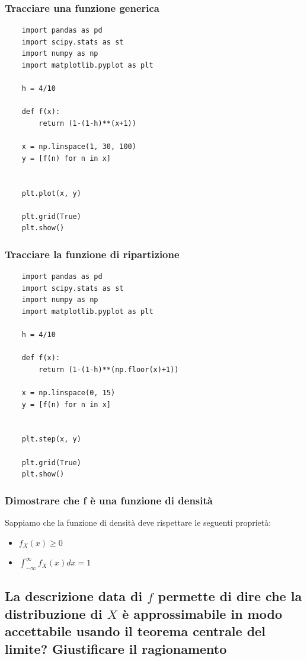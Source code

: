 \documentclass{article}
\begin{document}
\subsubsection*{Tracciare una funzione generica}

\begin{lstlisting}
    import pandas as pd
    import scipy.stats as st
    import numpy as np
    import matplotlib.pyplot as plt

    h = 4/10

    def f(x):
        return (1-(1-h)**(x+1))

    x = np.linspace(1, 30, 100)
    y = [f(n) for n in x]


    plt.plot(x, y)

    plt.grid(True)
    plt.show()
\end{lstlisting}

\pagebreak

\subsubsection*{Tracciare la funzione di ripartizione}

\begin{lstlisting}
    import pandas as pd
    import scipy.stats as st
    import numpy as np
    import matplotlib.pyplot as plt

    h = 4/10

    def f(x):
        return (1-(1-h)**(np.floor(x)+1))

    x = np.linspace(0, 15)
    y = [f(n) for n in x]


    plt.step(x, y)

    plt.grid(True)
    plt.show()
\end{lstlisting}

\subsubsection*{Dimostrare che f è una funzione di densità}


Sappiamo che la funzione di densità deve rispettare le seguenti proprietà:

\begin{itemize}
    \item $f_X(x) \geq 0$
    \item $\int_{-\infty}^{\infty}f_X(x) dx = 1$

\end{itemize}

\subsection*{La descrizione data di $f$ permette di dire che la distribuzione di $X$ è approssimabile in modo accettabile usando il teorema centrale del limite? Giustificare il ragionamento}
\end{document}
